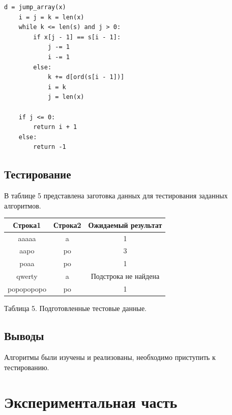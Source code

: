 \documentclass[a4paper,14pt]{article} %
\begin{document}
\begin{lstlisting}[caption=Алгоритм Бойера - Мура]
    d = jump_array(x)
    i = j = k = len(x)
    while k <= len(s) and j > 0:
        if x[j - 1] == s[i - 1]:
            j -= 1
            i -= 1
        else:
            k += d[ord(s[i - 1])]
            i = k
            j = len(x)

    if j <= 0:
        return i + 1
    else:
        return -1
\end{lstlisting}

\subsection{Тестирование}
	\hfill
	
	В таблице 5 представлена заготовка данных для тестирования заданных алгоритмов. 
	\begin{center}
		\begin{tabular}{  | c | c | c | }
			\hline
			\textbf{Строка1} & \textbf{Строка2} & \textbf{Ожидаемый результат} \\ \hline
   			aaaaa&a&1 \\ \hline
			
   			aapo & po & 3 \\ \hline
			
			poaa & po & 1 \\ \hline
			
			qwerty & a & Подстрока не найдена \\ \hline
			
			popopopopo & po & 1 \\ \hline
			
		\end{tabular}
		
		\hfill
		
		Таблица 5.
		Подготовленные тестовые данные.  
	\end{center}
        
	
 	\subsection{Выводы}
	\hfill
	
	Алгоритмы были изучены и реализованы, необходимо приступить к тестированию. 
        
        \newpage
        

        \section{Экспериментальная часть}
        \hfill
        
\end{document}
